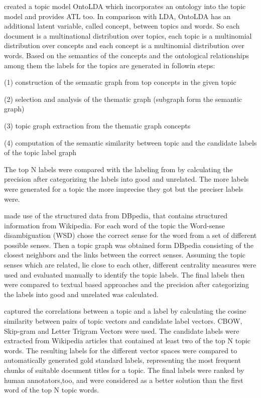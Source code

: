 \textit{\cite{Allahyari2015}} created a topic model OntoLDA which incorporates an ontology into the topic model and provides \ac{ATL} too. In comparison with \ac{LDA}, OntoLDA has an additional latent variable, called concept, between topics and words. So each document is a multinational distribution over topics, each topic is a multinomial distribution over concepts and each concept is a multinomial distribution over words.  Based on the semantics of the concepts and the ontological relationships among them the labels for the topics are generated in followin steps:
\begin{description}
	\item (1) construction of the semantic graph from top concepts in the given topic
	\item (2) selection and analysis of the thematic graph (subgraph form the semantic graph)
	\item (3) topic graph extraction from the thematic graph concepts
	\item (4) computation of the semantic similarity between topic and the candidate labels of the topic label graph
\end{description}
The top N labels were compared with the labeling from \textit{\cite{Mei2007}} by calculating the precision after categorizing the labels into good and unrelated. The more labels were generated for a topic the more imprecise they got but the preciser \textit{\cite{Mei2007}} labels were.

\textit{\cite{Hulpus2013}} made use of the structured data from DBpedia, that contains structured information from Wikipedia. For each word of the topic the Word-sense disambiguation (WSD) chose the correct sense for the word from a set of different possible senses. Then a topic graph was obtained form DBpedia consisting of the closest neighbors and the links between the correct senses. Assuming the topic senses which are related, lie close to each other, different centrality measures were used and evaluated manually to identify the topic labels. The final labels then were compared to textual based approaches and the precision after categorizing the labels into good and unrelated was calculated.

\cite{Kou2015} captured the correlations between a topic and a label by calculating the cosine similarity between pairs of topic vectors and candidate label vectors. CBOW, Skip-gram and Letter Trigram Vectors were used. The candidate labels were extracted from Wikipedia articles that contained at least two of the top N topic words. The resulting labels for the different vector spaces were compared to automatically generated gold standard labels, representing the most frequent chunks of suitable document titles for a topic. The final labels were ranked by human annotators,too, and were considered as a better solution than the first word of the top N topic words. 

